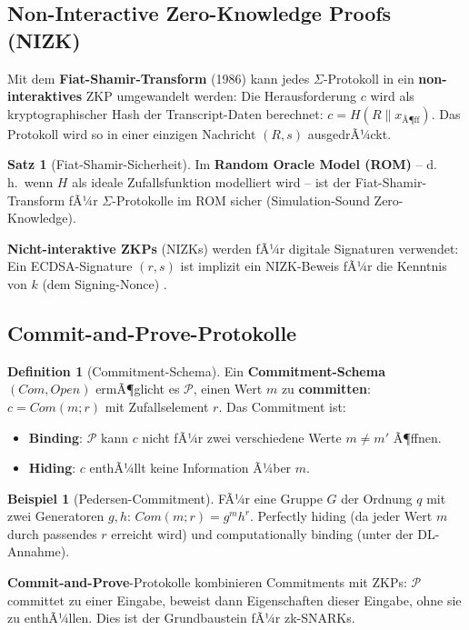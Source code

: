 ﻿\documentclass[a4paper,12pt]{scrreprt}
\theoremstyle{definition}
\newtheorem{definition}{Definition}[section]
\newtheorem{beispiel}{Beispiel}[section]
\newtheorem{satz}{Satz}[section]
\begin{document}
\subsection{Non-Interactive Zero-Knowledge Proofs (NIZK)}

Mit dem \textbf{Fiat-Shamir-Transform} (1986) kann jedes $\Sigma$-Protokoll in ein \textbf{non-interakti\-ves} ZKP umgewandelt werden: Die Herausforderung $c$ wird als kryptographischer Hash der Transcript-Daten berechnet: $c = H(R \| x_{\text{Ã¶ff}})$. Das Protokoll wird so in einer einzigen Nachricht $(R, s)$ ausgedrÃ¼ckt.

\begin{satz}[Fiat-Shamir-Sicherheit]
Im \textbf{Random Oracle Model (ROM)} -- d.\,h.\ wenn $H$ als ideale Zufallsfunktion modelliert wird -- ist der Fiat-Shamir-Transform fÃ¼r $\Sigma$-Protokolle im ROM sicher (Simulation-Sound Zero-Knowledge).
\end{satz}

\textbf{Nicht-interaktive ZKPs} (NIZKs) werden fÃ¼r digitale Signaturen verwendet: Ein ECDSA-Signature $(r, s)$ ist implizit ein NIZK-Beweis fÃ¼r die Kenntnis von $k$ (dem Signing-Nonce) \cite{GMR88}.

\subsection{Commit-and-Prove-Protokolle}

\begin{definition}[Commitment-Schema]
Ein \textbf{Commitment-Schema} $(Com, Open)$ ermÃ¶glicht es $\mathcal{P}$, einen Wert $m$ zu \textbf{committen}: $c = Com(m; r)$ mit Zufallselement $r$. Das Commitment ist:
\begin{itemize}
    \item \textbf{Binding}: $\mathcal{P}$ kann $c$ nicht fÃ¼r zwei verschiedene Werte $m \neq m'$ Ã¶ffnen.
    \item \textbf{Hiding}: $c$ enthÃ¼llt keine Information Ã¼ber $m$.
\end{itemize}
\end{definition}

\begin{beispiel}[Pedersen-Commitment]
FÃ¼r eine Gruppe $G$ der Ordnung $q$ mit zwei Generatoren $g, h$: $Com(m; r) = g^m h^r$. Perfectly hiding (da jeder Wert $m$ durch passendes $r$ erreicht wird) und computationally binding (unter der DL-Annahme).
\end{beispiel}

\textbf{Commit-and-Prove}-Protokolle kombinieren Commitments mit ZKPs: $\mathcal{P}$ committet zu einer Eingabe, beweist dann Eigenschaften dieser Eingabe, ohne sie zu enthÃ¼llen. Dies ist der Grundbaustein fÃ¼r zk-SNARKs.
\end{document}
